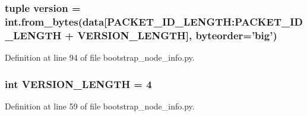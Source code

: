 \hypertarget{namespacebootstrap__node__info_a76aa01cd80eeb03b381ebe36f17c16b2}{
\subsubsection[{version}]{\setlength{\rightskip}{0pt plus 5cm}tuple version = int.\+from\+\_\+bytes(data\mbox{[}P\+A\+C\+K\+E\+T\+\_\+\+I\+D\+\_\+\+L\+E\+N\+G\+T\+H\+:\+P\+A\+C\+K\+E\+T\+\_\+\+I\+D\+\_\+\+L\+E\+N\+G\+T\+H + {\bf V\+E\+R\+S\+I\+O\+N\+\_\+\+L\+E\+N\+G\+T\+H}\mbox{]}, byteorder='big')}}\label{namespacebootstrap__node__info_a76aa01cd80eeb03b381ebe36f17c16b2}


Definition at line 94 of file bootstrap\+\_\+node\+\_\+info.\+py.

\hypertarget{namespacebootstrap__node__info_a2bd90f1deb0ecd828b4d7ebfc8a1dd18}{
\subsubsection[{V\+E\+R\+S\+I\+O\+N\+\_\+\+L\+E\+N\+G\+T\+H}]{\setlength{\rightskip}{0pt plus 5cm}int V\+E\+R\+S\+I\+O\+N\+\_\+\+L\+E\+N\+G\+T\+H = 4}}\label{namespacebootstrap__node__info_a2bd90f1deb0ecd828b4d7ebfc8a1dd18}


Definition at line 59 of file bootstrap\+\_\+node\+\_\+info.\+py.

